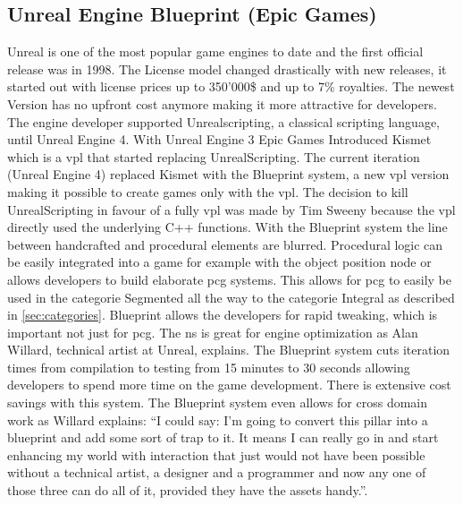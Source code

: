 \documentclass[10pt,a4paper]{article}
\begin{document}
\subsection{Unreal Engine Blueprint (Epic Games)}
\begin{multicols}{2}
Unreal is one of the most popular game engines to date and the first official release was in 1998. The License model changed drastically with new releases, it started out with license prices up to 350’000\$ and up to 7\% royalties\cite{Herz1999}. The newest Version has no upfront cost anymore making it more attractive for developers. The engine developer supported Unrealscripting, a classical scripting language, until Unreal Engine 4. With Unreal Engine 3 Epic Games Introduced Kismet which is a \gls{vpl} that started replacing UnrealScripting. The current iteration (Unreal Engine 4) replaced Kismet with the Blueprint system, a new \gls{vpl} version making it possible to create games only with the \gls{vpl}. The decision to kill UnrealScripting in favour of a fully \gls{vpl} was made by Tim Sweeny because the \gls{vpl} directly used the underlying C++ functions\cite{Wawro2017}. With the Blueprint system the line between handcrafted and procedural elements are blurred. Procedural logic can be easily integrated into a game for example with the object position node or allows developers to build elaborate \gls{pcg} systems. This allows for \gls{pcg} to easily be used in the categorie Segmented all the way to the categorie Integral as described in \autoref{sec:categories}. Blueprint allows the developers for rapid tweaking, which is important not just for \gls{pcg}. The \gls{ns} is great for engine optimization as Alan Willard, technical artist at Unreal, explains. The Blueprint system cuts iteration times from compilation to testing from 15 minutes to 30 seconds allowing developers to spend more time on the game development\cite{Totilo2012}. There is extensive cost savings with this system. The Blueprint system even allows for cross domain work as Willard explains: “I could say: I’m going to convert this pillar into a blueprint and add some sort of trap to it. It means I can really go in and start enhancing my world with interaction that just would not have been possible without a technical artist, a designer and a programmer and now any one of those three can do all of it, provided they have the assets handy.”\cite{Totilo2012}.\end{multicols}
\end{document}

